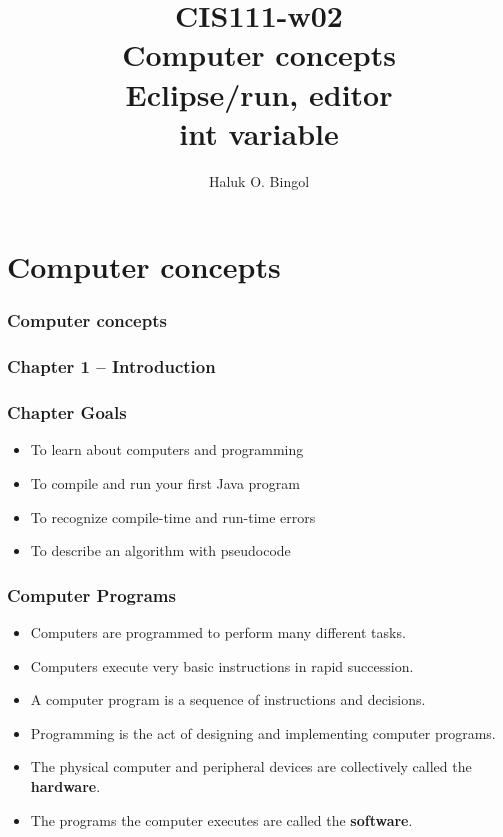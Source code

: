 \documentclass{beamer}
\title[CIS111-w02]{CIS111-w02\\Computer concepts\\Eclipse/run, editor\\int variable}
\author[Bingol]{Haluk O. Bingol}
\institute[FCIS]{
    Faculty of Computer and Information Sciences\\
    Yeditepe University
}
\date{}
\begin{document}
\begin{frame}[t,fragile] \frametitle{}
    \titlepage
\end{frame}

\section{Computer concepts}

\begin{frame}[t,fragile] \frametitle{Computer concepts} %
\end{frame}

\begin{frame}[t,fragile] \frametitle{Chapter 1 -- Introduction} %
\end{frame}

\begin{frame}[t,fragile] \frametitle{Chapter Goals} %
    \begin{itemize}
        \item To learn about computers and programming
        \item To compile and run your first Java program
        \item To recognize compile-time and run-time errors
        \item To describe an algorithm with pseudocode
    \end{itemize}
\end{frame}

\begin{frame}[t,fragile] \frametitle{Computer Programs} %
    \begin{itemize}
        \item Computers are programmed to perform many different tasks.
        \item Computers execute very basic instructions in rapid succession.
        \item A computer program is a sequence of instructions and decisions.
        \item Programming is the act of designing and implementing computer programs.
        \item The physical computer and peripheral devices are collectively called the \textbf{hardware}.
        \item The programs the computer executes are called the \textbf{software}.
    \end{itemize}
\end{frame}
\end{document}

